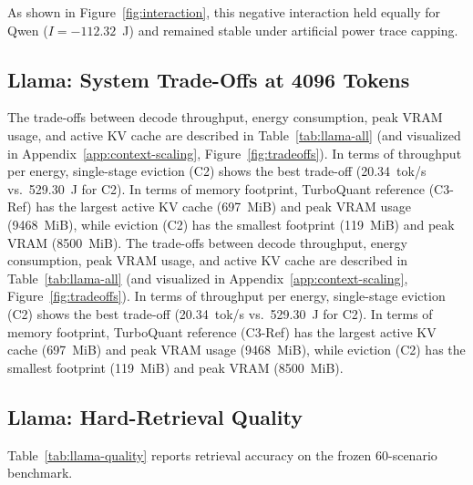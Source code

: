 \documentclass[sigconf,nonacm]{acmart}
\begin{document}
As shown in Figure~\ref{fig:interaction}, this negative interaction held equally for Qwen ($I = -112.32$~J) and remained stable under artificial power trace capping.

\subsection{Llama: System Trade-Offs at 4096 Tokens}

The trade-offs between decode throughput, energy consumption, peak VRAM usage, and active KV cache are described in Table~\ref{tab:llama-all} (and visualized in Appendix~\ref{app:context-scaling}, Figure~\ref{fig:tradeoffs}). In terms of throughput per energy, single-stage eviction (C2) shows the best trade-off (20.34~tok/s vs.\ 529.30~J for C2). In terms of memory footprint, TurboQuant reference (C3-Ref) has the largest active KV cache (697~MiB) and peak VRAM usage (9468~MiB), while eviction (C2) has the smallest footprint (119~MiB) and peak VRAM (8500~MiB).
The trade-offs between decode throughput, energy consumption, peak VRAM usage, and active KV cache are described in Table~\ref{tab:llama-all} (and visualized in Appendix~\ref{app:context-scaling}, Figure~\ref{fig:tradeoffs}). In terms of throughput per energy, single-stage eviction (C2) shows the best trade-off (20.34~tok/s vs.\ 529.30~J for C2). In terms of memory footprint, TurboQuant reference (C3-Ref) has the largest active KV cache (697~MiB) and peak VRAM usage (9468~MiB), while eviction (C2) has the smallest footprint (119~MiB) and peak VRAM (8500~MiB).
\subsection{Llama: Hard-Retrieval Quality}

Table~\ref{tab:llama-quality} reports retrieval accuracy on the frozen 60-scenario benchmark.
\end{document}
